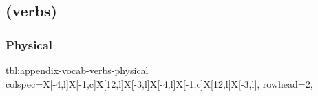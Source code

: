 \documentclass[../nihongo-gakushuu-kyouzai.tex]{subfiles}
\begin{document}
\appendix
\setcounter{section}{2}
\setcounter{subsection}{4}

\subsection{ (verbs)} \label{appendix:verbs}

\subsubsection{Physical}
{tbl:appendix-vocab-verbs-physical}  %
{
    colspec={X[-4,l]X[-1,c]X[12,l]X[-3,l]X[-4,l]X[-1,c]X[12,l]X[-3,l]},
    rowhead=2,
}  %
\end{document}
